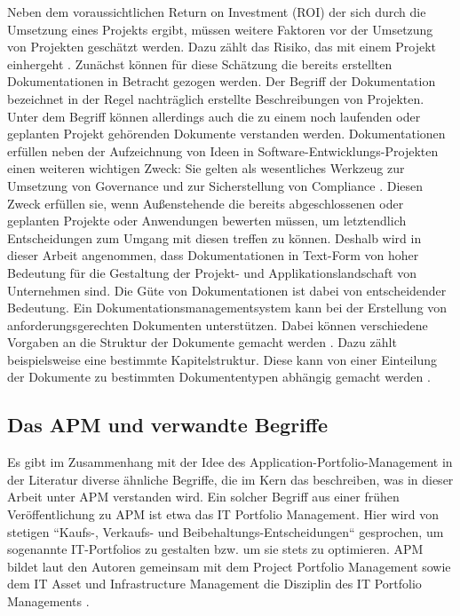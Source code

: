 Neben dem voraussichtlichen Return on Investment (ROI) der sich durch die Umsetzung eines Projekts ergibt, müssen weitere Faktoren vor der Umsetzung von Projekten geschätzt werden. Dazu zählt das Risiko, das mit einem Projekt einhergeht \cite[S. 120ff.]{gadatsch}. Zunächst können für diese Schätzung die bereits erstellten Dokumentationen in Betracht gezogen werden. Der Begriff der Dokumentation bezeichnet in der Regel nachträglich erstellte Beschreibungen von Projekten. Unter dem Begriff können allerdings auch die zu einem noch laufenden oder geplanten Projekt gehörenden Dokumente verstanden werden. Dokumentationen erfüllen neben der Aufzeichnung von Ideen in Software-Entwicklungs-Projekten einen weiteren wichtigen Zweck: Sie gelten als wesentliches Werkzeug zur Umsetzung von Governance und zur Sicherstellung von Compliance \cite[S. 2]{reiss}. Diesen Zweck erfüllen sie, wenn Außenstehende die bereits abgeschlossenen oder geplanten Projekte oder Anwendungen bewerten müssen, um letztendlich Entscheidungen zum Umgang mit diesen treffen zu können. Deshalb wird in dieser Arbeit angenommen, dass Dokumentationen in Text-Form von hoher Bedeutung für die Gestaltung der Projekt- und Applikationslandschaft von Unternehmen sind. Die Güte von Dokumentationen ist dabei von entscheidender Bedeutung. Ein Dokumentationsmanagementsystem kann bei der Erstellung von anforderungsgerechten Dokumenten unterstützen. Dabei können verschiedene Vorgaben an die Struktur der Dokumente gemacht werden \cite[S. 29]{reiss}. Dazu zählt beispielsweise eine bestimmte Kapitelstruktur. Diese kann von einer Einteilung der Dokumente zu bestimmten Dokumententypen abhängig gemacht werden \cite[S. 34-39]{reiss}.

\subsection {Das APM und verwandte Begriffe}
Es gibt im Zusammenhang mit der Idee des Application-Portfolio-Management in der Literatur diverse ähnliche Begriffe, die im Kern das beschreiben, was in dieser Arbeit unter APM verstanden wird. Ein solcher Begriff aus einer frühen Veröffentlichung zu APM ist etwa das IT Portfolio Management. Hier wird von stetigen ``Kaufs-, Verkaufs- und Beibehaltungs-Entscheidungen`` gesprochen, um sogenannte IT-Portfolios zu gestalten bzw. um sie stets zu optimieren. APM bildet laut den Autoren gemeinsam mit dem Project Portfolio Management sowie dem IT Asset und Infrastructure Management die Disziplin des IT Portfolio Managements \cite[S. 2-14]{Gliedman}.

